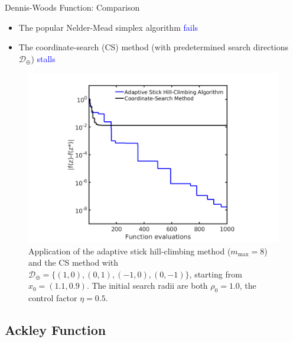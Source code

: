 \documentclass{beamer}
\begin{document}
\begin{frame}{Dennis-Woods Function: Comparison}
\begin{itemize}
	\item The popular Nelder-Mead simplex algorithm \textcolor{blue}{fails}
	\item The coordinate-search (CS) method (with predetermined search
		directions $\mathcal{D}_\oplus$) \textcolor{blue}{stalls}
\end{itemize}
\begin{figure}[!htbp]
	\centering
	  \includegraphics[scale=0.17]{./figures/dwoods_cmp.png}
	  \caption{
	  \footnotesize{
	  Application of the adaptive stick hill-climbing method
	  ($m_{\max}=8$) and the CS method with
	  $\mathcal{D}_{\oplus}=\{(1,0), (0,1), (-1,0), (0,-1)\}$,
	  starting from $x_0=(1.1, 0.9)$.
	  The initial search radii are both $\rho_0 = 1.0$,
	  the control factor $\eta=0.5$.}
	  }
\label{fig:dwfun:cmp}
\end{figure}
\end{frame}

\subsection{Ackley Function}
\end{document}
